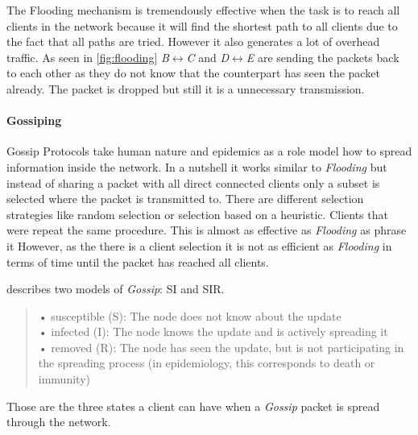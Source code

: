 The Flooding mechanism is tremendously effective when the task is to reach all clients in the network because it will find the shortest path to all clients due to the fact that all paths are tried.
However it also generates a lot of overhead traffic. As seen in \cref{fig:flooding} \textit{B}$\leftrightarrow$︎\textit{C} and \textit{D}$\leftrightarrow$\textit{E} are sending the packets back to each other as they do not know that the counterpart has seen the packet already. The packet is dropped but still it is a unnecessary transmission.

\paragraph{Gossiping}\label{gossiping}
Gossip Protocols take human nature and epidemics as a role model how to spread information inside the network. 
In a nutshell it works similar to \textit{Flooding} but instead of sharing a packet with all direct connected clients only a subset is selected where the packet is transmitted to. There are different selection strategies like random selection or selection based on a heuristic. 
Clients that were  repeat the same procedure. This is almost as effective as \textit{Flooding} as \citet{riviere_voulgaris_2011} phrase it 
However, as the there is a client selection it is not as efficient as \textit{Flooding} in terms of time until the packet has reached all clients.

\citet{Jelasity2011} describes two models of \textit{Gossip}: SI and SIR. 

\begin{quote}
• susceptible (S): The node does not know about the update\\
• infected (I): The node knows the update and is actively spreading it\\
• removed (R): The node has seen the update, but is not participating in the spreading process (in epidemiology, this corresponds to death or immunity)
\end{quote}\cite[\S1.2.2]{Jelasity2011}

Those are the three states a client can have when a \textit{Gossip} packet is spread through the network.

